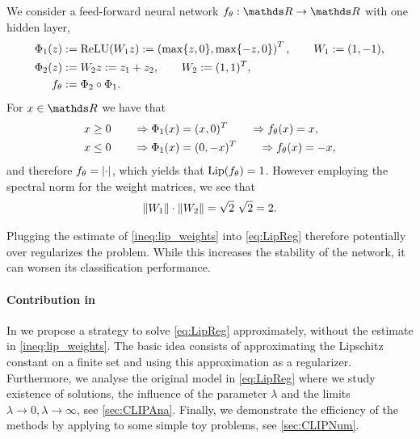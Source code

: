 \begin{example}{}{}
We consider a feed-forward neural network $\net_\param:\R\to\R$ with one hidden layer,
%
\begin{align*}
\Phi_1(z) &:= \operatorname{ReLU}(W_1 z) :=\left(\max\{z, 0\}, \max\{-z, 0\}\right)^T,\qquad 
W_1:= (1,-1),\\
\Phi_2(z) &:= W_2 z := z_1 + z_2,\qquad W_2:=(1,1)^T,\\
f_\theta&:= \Phi_2\circ\Phi_1.
\end{align*}
%
For $\inp\in\R$ we have that 
%
\begin{align*}
x&\geq 0 \qquad\Rightarrow\Phi_1(x) = (x, 0)^T \qquad\Rightarrow f_\theta(x)=x,\\
x&\leq 0 \qquad\Rightarrow\Phi_1(x) = (0, -x)^T \qquad\Rightarrow f_\theta(x)=-x,
\end{align*}
%
and therefore $f_\theta = \left|\cdot\right|$, which yields that $\operatorname{Lip}(f_\theta)=1$. However employing the spectral norm for the weight matrices, we see that
%
\begin{align*}
\left\|W_1\right\|\cdot\left\|W_2\right\| = \sqrt{2}\ \sqrt{2} = 2.	
\end{align*}
%
\end{example}
%
\noindent%
Plugging the estimate of \cref{ineq:lip_weights} into \cref{eq:LipReg} therefore potentially over regularizes the problem. While this increases the stability of the network, it can worsen its classification performance.
%
\paragraph{Contribution in \cite{bungert2021clip}} In \cite{bungert2021clip} we propose a strategy to solve \cref{eq:LipReg} approximately, without the estimate in \cref{ineq:lip_weights}. The basic idea consists of approximating the Lipschitz constant on a finite set and using this approximation as a regularizer. Furthermore, we analyse the original model in \cref{eq:LipReg} where we study existence of solutions, the influence of the parameter $\lambda$ and the limits $\lambda\to 0, \lambda\to \infty$, see \cref{sec:CLIPAna}. Finally, we demonstrate the efficiency of the methods by applying to some simple toy problems, see \cref{sec:CLIPNum}.


